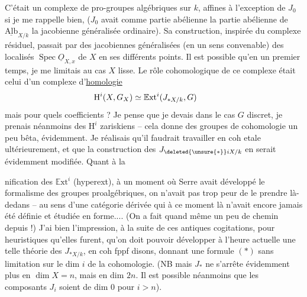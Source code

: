C'était un complexe de pro-groupes algébriques sur $k$, affines à l'exception de $J_0$ si je me rappelle bien, ($J_0$ avait comme partie abélienne la partie abélienne de $\underline{\mathrm{Alb}}_{X/k}$
la jacobienne généralisée ordinaire). Sa construction, inspirée du complexe résiduel, passait par des jacobiennes généralisées (en un sens  convenable) des localisés $\operatorname{Spec}\underline{O}_{X,x}$ de $X$ en ses différents points. Il est possible qu'en un premier temps, je me limitais au cas $X$ lisse. Le rôle cohomologique de ce complexe était celui d'un complexe d'\uline{homologie}
\[
\mathrm{H}^{i}(X,G_X)\simeq\mathbb{E}\mathrm{xt}^{i}(J_{*X/k},G)\tag*{\makebox[0pt][r]{\makebox[\linewidth][l]{\unsure{\ensuremath{\alpha})|a)|(*)}}}}
\]
mais pour quels coefficients ? Je pense que je devais     dans le cas $G$ discret, je prenais néanmoins des $\mathrm{H}^{i}$ zariskiens -- cela donne des groupes de cohomologie un peu bêta, évidemment. Je réalisais qu'il faudrait travailler en coh etale ultérieurement, et que la construction des $J_{\deleted{\unsure{*}}iX/k}$ en serait évidemment modifiée. Quant à la %

%
nification des $\mathbb{E}\mathrm{xt}^{i}$ (hyperext), à un moment où Serre avait développé le formalisme des groupes proalgébriques, on n'avait pas trop peur de le prendre là-dedans -- au sens d'une catégorie dérivée qui à ce moment là n'avait encore jamais été définie et étudiée en forme.... (On a fait quand même un peu de chemin depuis !) J'ai bien l'impression, à la suite de ces antiques cogitations, pour heuristiques qu'elles furent, qu'on doit pouvoir développer à l'heure actuelle une telle théorie des $J_{*X/k}$, en coh fppf disons, donnant une formule $(*)$ sans limitation sur le dim $i$ de la cohomologie. (NB mais $J_*$ ne s'arrête évidemment plus en $\dim X=n$, mais en dim $2n$. Il est possible néanmoins que les composants $J_i$ soient de dim $0$ pour $i>n$).

